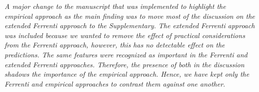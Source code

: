 \documentclass[11pt, a4paper]{letter} %
\begin{document}
\textit{A major change to the manuscript that was implemented to highlight the empirical approach as the main finding was to move most of the discussion on the extended Ferrenti approach to the Supplementary. The extended Ferrenti approach was included because we wanted to remove the effect of practical considerations from the Ferrenti approach, however, this has no detectable effect on the predictions. The same features were recognized as important in the Ferrenti and extended Ferrenti approaches. Therefore, the presence of both in the discussion shadows the importance of the empirical approach. Hence, we have kept only the Ferrenti and empirical approaches to contrast them against one another. }

\end{document}

